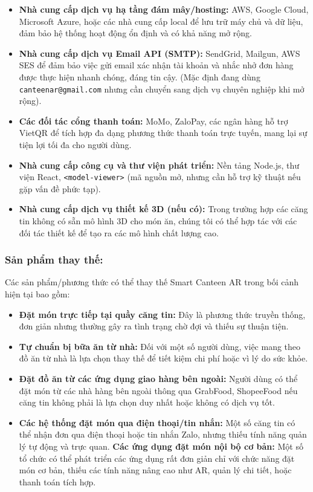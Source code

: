 \documentclass[12pt,a4paper]{article}
\begin{document}
\begin{itemize}[label=\textbullet]
    \item \textbf{Nhà cung cấp dịch vụ hạ tầng đám mây/hosting:} AWS, Google Cloud, Microsoft Azure, hoặc các nhà cung cấp local để lưu trữ máy chủ và dữ liệu, đảm bảo hệ thống hoạt động ổn định và có khả năng mở rộng.
    \item \textbf{Nhà cung cấp dịch vụ Email API (SMTP):} SendGrid, Mailgun, AWS SES để đảm bảo việc gửi email xác nhận tài khoản và nhắc nhở đơn hàng được thực hiện nhanh chóng, đáng tin cậy. (Mặc định đang dùng \texttt{canteenar@gmail.com} nhưng cần chuyển sang dịch vụ chuyên nghiệp khi mở rộng).
    \item \textbf{Các đối tác cổng thanh toán:} MoMo, ZaloPay, các ngân hàng hỗ trợ VietQR để tích hợp đa dạng phương thức thanh toán trực tuyến, mang lại sự tiện lợi tối đa cho người dùng.
    \item \textbf{Nhà cung cấp công cụ và thư viện phát triển:} Nền tảng Node.js, thư viện React, \texttt{<model-viewer>} (mã nguồn mở, nhưng cần hỗ trợ kỹ thuật nếu gặp vấn đề phức tạp).
    \item \textbf{Nhà cung cấp dịch vụ thiết kế 3D (nếu có):} Trong trường hợp các căng tin không có sẵn mô hình 3D cho món ăn, chúng tôi có thể hợp tác với các đối tác thiết kế để tạo ra các mô hình chất lượng cao.
\end{itemize}

\subsubsection{Sản phẩm thay thế:}
Các sản phẩm/phương thức có thể thay thế Smart Canteen AR trong bối cảnh hiện tại bao gồm:

\begin{itemize}[label=\textbullet]
    \item \textbf{Đặt món trực tiếp tại quầy căng tin:} Đây là phương thức truyền thống, đơn giản nhưng thường gây ra tình trạng chờ đợi và thiếu sự thuận tiện.
    \item \textbf{Tự chuẩn bị bữa ăn từ nhà:} Đối với một số người dùng, việc mang theo đồ ăn từ nhà là lựa chọn thay thế để tiết kiệm chi phí hoặc vì lý do sức khỏe.
    \item \textbf{Đặt đồ ăn từ các ứng dụng giao hàng bên ngoài:} Người dùng có thể đặt món từ các nhà hàng bên ngoài thông qua GrabFood, ShopeeFood nếu căng tin không phải là lựa chọn duy nhất hoặc không có dịch vụ tốt.
    \item \textbf{Các hệ thống đặt món qua điện thoại/tin nhắn:} Một số căng tin có thể nhận đơn qua điện thoại hoặc tin nhắn Zalo, nhưng thiếu tính năng quản lý tự động và trực quan.
    \textbf{Các ứng dụng đặt món nội bộ cơ bản:} Một số tổ chức có thể phát triển các ứng dụng rất đơn giản chỉ với chức năng đặt món cơ bản, thiếu các tính năng nâng cao như AR, quản lý chi tiết, hoặc thanh toán tích hợp.
\end{itemize}
\end{document}
